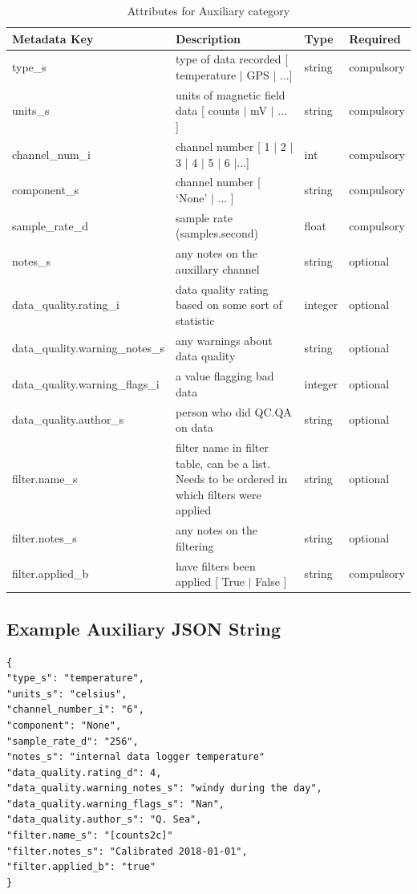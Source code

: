 \documentclass{article}
\begin{document}
\begin{table}[htb!]
	\caption[Attributes for Auxiliary Channel]{Attributes for Auxiliary category}
	\begin{tabular}{|l|p{3in}|l|l|}
		\hline
		\textbf{Metadata Key} & \textbf{Description} & \textbf{Type} & \textbf{Required} \\ \hline
		type\_s & type of data recorded [ temperature $|$ GPS $|$ ...] & string & compulsory \\ \hline
		units\_s & units of magnetic field data [ counts $|$ mV $|$ ... ] & string &  compulsory \\ \hline
		channel\_num\_i & channel number [ 1 $|$ 2 $|$ 3 $|$ 4 $|$ 5 $|$ 6 $|$...] & int &  compulsory \\ \hline
		component\_s & channel number [ `None' $|$ ... ] & string &  compulsory \\ \hline
		sample\_rate\_d & sample rate (samples.second) & float &  compulsory \\ \hline
		notes\_s & any notes on the auxillary channel & string &  optional \\ \hline
		data\_quality.rating\_i & data quality rating based on some sort of statistic & integer &  optional \\ \hline
		data\_quality.warning\_notes\_s & any warnings about data quality & string &   optional \\ \hline
		data\_quality.warning\_flags\_i & a value flagging bad data  & integer &  optional \\ \hline
		data\_quality.author\_s & person who did QC.QA on data & string &   optional \\ \hline
		filter.name\_s & filter name in filter table, can be a list. Needs to be ordered in which filters were applied & string &  optional \\ \hline
		filter.notes\_s & any notes on the filtering & string &  optional \\ \hline
		filter.applied\_b & have filters been applied [ True $|$ False ] & string & compulsory \\ \hline
	\end{tabular}
	\label{tab:aux}
\end{table}

\subsection{Example Auxiliary JSON String} 

\begin{verbatim}
{
"type_s": "temperature",
"units_s": "celsius",
"channel_number_i": "6",
"component": "None",
"sample_rate_d": "256",
"notes_s": "internal data logger temperature"
"data_quality.rating_d": 4,
"data_quality.warning_notes_s": "windy during the day",
"data_quality.warning_flags_s": "Nan",
"data_quality.author_s": "Q. Sea",
"filter.name_s": "[counts2c]"
"filter.notes_s": "Calibrated 2018-01-01",
"filter.applied_b": "true"
}
\end{verbatim}
\end{document}
